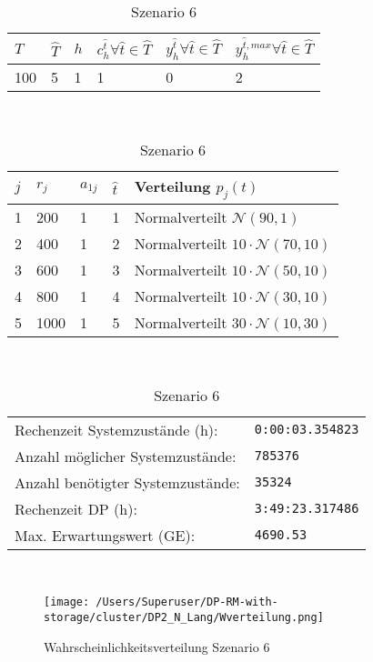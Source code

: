 \begin{table}[h!]
\renewcommand{\arraystretch}{1.5}
  \begin{center}
    \caption{Szenario 6}  \label{S6}
    \vspace*{3mm}
    \begin{tabular}{l l l l l l}   %
    $T$ & $\hat T$  & $h$ & $c_h^{\hat t}\forall \hat{t}\in{\hat T}$ & $y_h^{\hat t}\forall \hat{t}\in{\hat T}$  & $y_h^{{\hat t},max}\forall \hat{t}\in{\hat T}$  \\  \hline
100 & 5 & 1 & 1 & 0 & 2  \\ \hline
    \end{tabular} \\[3mm]
        \begin{tabular}{p{1cm} p{1cm} p{1cm}  p{1cm} p{6cm}}   %
    $j$ & $r_j$  & $a_{1j}$ & $\hat t$ & Verteilung $p_j(t)$ \\  \hline
1 & 200 & 1 & 1 & Normalverteilt $\mathcal{N}(90, 1)$   \\
2 & 400 & 1 & 2 & Normalverteilt $10\cdot\mathcal{N}(70, 10)$  \\
3 & 600 & 1 & 3 & Normalverteilt $10\cdot\mathcal{N}(50, 10)$  \\
4 & 800 & 1 & 4 & Normalverteilt $10\cdot\mathcal{N}(30, 10)$  \\
5 & 1000 & 1 & 5 & Normalverteilt $30\cdot\mathcal{N}(10, 30)$ \\
\hline
    \end{tabular} \\[3mm]
     \begin{tabular}{p{7cm}p{5cm}} \hline
     Rechenzeit Systemzustände (h): & \texttt{0:00:03.354823} \\
     Anzahl möglicher Systemzustände: & \texttt{785376} \\
     Anzahl benötigter Systemzustände: & \texttt{35324} \\ 
     Rechenzeit DP (h): & \texttt{3:49:23.317486} \\ 
          Max. Erwartungswert (GE): & \texttt{4690.53} \\ \hline
         \end{tabular} \\[3mm]
  \end{center}
\end{table}

\begin{figure}[h!]
  \begin{center}
    \texttt{[image: /Users/Superuser/DP-RM-with-storage/cluster/DP2\_N\_Lang/Wverteilung.png]}
    \caption{Wahrscheinlichkeitsverteilung Szenario 6}  \label{SB6}
  \end{center}
\end{figure}

